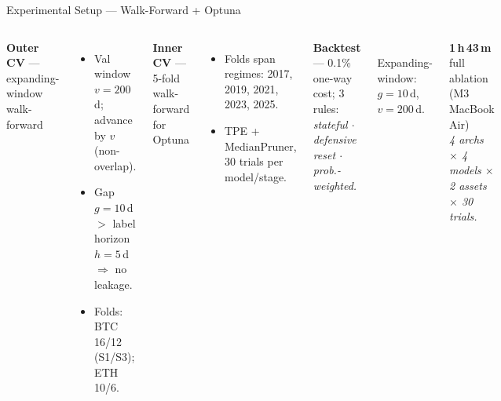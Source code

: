 \documentclass[aspectratio=169,11pt]{beamer}
\newcommand{\hl}[1]{\textcolor{itunavy}{\textbf{#1}}}
\newcommand{\fnote}[1]{{\scriptsize\textit{#1}}}
\begin{document}
\begin{frame}{Experimental Setup --- Walk-Forward + Optuna}
\small
\begin{columns}[T,onlytextwidth]
\textbf{Outer CV} --- expanding-window walk-forward
\begin{itemize}\setlength{\itemsep}{0pt}
\item Val window $v=200$\,d; advance by $v$ (non-overlap).
\item Gap $g=10$\,d $>$ label horizon $h=5$\,d $\Rightarrow$ \alert{no leakage}.
\item Folds: BTC 16/12 (S1/S3); ETH 10/6.
\end{itemize}

\vspace{2pt}
\textbf{Inner CV} --- 5-fold walk-forward for Optuna
\begin{itemize}\setlength{\itemsep}{0pt}
\item Folds span regimes: 2017, 2019, 2021, 2023, 2025.
\item TPE + MedianPruner, 30 trials per model/stage.
\end{itemize}

\vspace{2pt}
\textbf{Backtest} --- 0.1\% one-way cost; 3 rules:
\fnote{stateful $\cdot$ defensive reset $\cdot$ prob.-weighted.}

\centering
{}\\[-3pt]
{\scriptsize Expanding-window: $g=10$\,d, $v=200$\,d.}

\vspace{8pt}
\hl{1\,h\,43\,m} full ablation\\(M3 MacBook Air)\\[2pt]
\fnote{4 archs $\times$ 4 models $\times$ 2 assets $\times$ 30 trials.}
\end{columns}
\end{frame}
\end{document}
